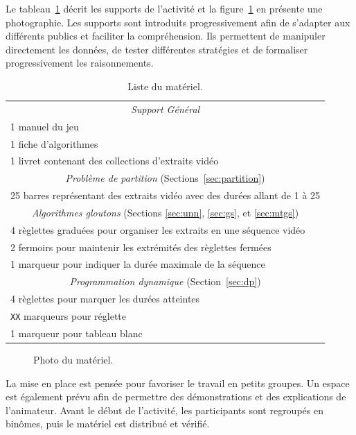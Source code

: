 \documentclass[a4paper,twoside]{article}
\begin{document}
Le tableau~\ref{tab:materiel} décrit les supports de l'activité et la figure~\ref{fig:materiel} en présente une photographie.
Les supports sont introduits progressivement afin de s'adapter aux différents publics et faciliter la compréhension.
Ils permettent de manipuler directement les données, de tester différentes stratégies et de formaliser progressivement les raisonnements.



\begin{table}[htbp]
  \centering
  \begin{tabular}{p{\textwidth}}
    \toprule
    \multicolumn{1}{c}{\emph{Support Général}} \\
     1 manuel du jeu  \\
     1 fiche d'algorithmes  \\
     1 livret contenant des collections d'extraits vidéo \\
    \midrule
    \multicolumn{1}{c}{\emph{Problème de partition} (Sections~\ref{sec:partition})} \\
     25 barres représentant des extraits vidéo avec des durées allant de 1 à 25 \\
    \midrule
    \multicolumn{1}{c}{\emph{Algorithmes gloutons} (Sections \ref{sec:unn}, \ref{sec:gs}, et \ref{sec:mtgs})} \\
     4 règlettes graduées pour organiser les extraits en une séquence vidéo \\
     2 fermoirs pour maintenir les extrémités des règlettes fermées \\
     1 marqueur pour indiquer la durée maximale de la séquence \\
    \midrule
    \multicolumn{1}{c}{\emph{Programmation dynamique} (Section~\ref{sec:dp})} \\
    4 règlettes pour marquer les durées atteintes \\
    \texttt{XX} marqueurs pour réglette  \\
    1 marqueur pour tableau blanc  \\
    \bottomrule
  \end{tabular}
  \caption{Liste du matériel.}
  \label{tab:materiel}
\end{table}

\begin{figure}[htbp]
  \centering

  \caption{Photo du matériel.}
  \label{fig:materiel}
\end{figure}

La mise en place est pensée pour favoriser le travail en petits groupes.
Un espace est également prévu afin de permettre des démonstrations et des explications de l'animateur.
Avant le début de l'activité, les participants sont regroupés en binômes, puis le matériel est distribué et vérifié.
\end{document}
